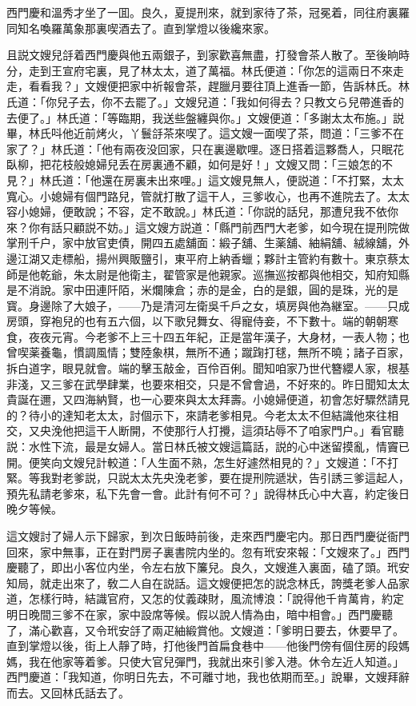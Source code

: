 西門慶和溫秀才坐了一囬。良久，夏提刑來，就到家待了茶，冠冕着，同往府裏羅同知名喚羅萬象那裏喫酒去了。直到掌燈以後纔來家。

且説文嫂兒㧱着西門慶與他五兩銀子，到家歡喜無盡，打發會茶人散了。至後晌時分，走到王宣府宅裏，見了林太太，道了萬福。林氏便道：「你怎的這兩日不來走走，看看我？」文嫂便把家中祈報會茶，趕臘月要往頂上進香一節，告訴林氏。林氏道：「你兒子去，你不去罷了。」文嫂兒道：「我如何得去？只教文ら兒帶進香的去便了。」林氏道：「等臨期，我送些盤纏與你。」文嫂便道：「多謝太太布施。」説畢，林氏呌他近前烤火，丫鬟㧱茶來喫了。這文嫂一面喫了茶，問道：「三爹不在家了？」林氏道：「他有兩夜没回家，只在裏邊歇哩。逐日搭着這夥喬人，只眠花臥柳，把花枝般媳婦兒丢在房裏通不顧，如何是好！」文嫂又問：「三娘怎的不見？」林氏道：「他還在房裏未出來哩。」這文嫂見無人，便説道：「不打緊，太太寬心。小媳婦有個門路兒，管就打散了這干人，三爹收心，也再不進院去了。太太容小媳婦，便敢說；不容，定不敢說。」林氏道：「你説的話兒，那遭兒我不依你來？你有話只顧説不妨。」這文嫂方説道：「縣門前西門大老爹，如今現在提刑院做掌刑千户，家中放官吏債，開四五處舖面：緞子舖、生薬舖、紬絹舖、絨線舖，外邊江湖又走標船，揚州興販鹽引，東平府上納香蠟；夥計主管約有數十。東京蔡太師是他乾爺，朱太尉是他衛主，翟管家是他親家。巡撫巡按都與他相交，知府知縣是不消說。家中田連阡陌，米爛陳倉；赤的是金，白的是銀，圓的是珠，光的是寳。身邊除了大娘子，——乃是清河左衛吳千戶之女，填房與他為継室。——只成房頭，穿袍兒的也有五六個，以下歌兒舞女、得寵侍妾，不下數十。端的朝朝寒食，夜夜元宵。今老爹不上三十四五年紀，正是當年漢子，大身材，一表人物；也曾喫薬養龜，慣調風情；雙陸象棋，無所不通；蹴踘打毬，無所不曉；諸子百家，拆白道字，眼見就會。端的擊玉敲金，百伶百俐。聞知咱家乃世代簪纓人家，根基非淺，又三爹在武學肆業，也要來相交，只是不曾會過，不好來的。昨日聞知太太貴誕在邇，又四海納賢，也一心要來與太太拜壽。小媳婦便道，初會怎好驟然請見的？待小的達知老太太，討個示下，來請老爹相見。今老太太不但結識他來往相交，又央浼他把這干人断開，不使那行人打攪，這須玷辱不了咱家門户。」看官聽説：水性下流，最是女婦人。當日林氏被文嫂這篇話，説的心中迷留摸亂，情竇已開。便笑向文嫂兒計較道：「人生面不熟，怎生好遽然相見的？」文嫂道：「不打緊。等我對老爹説，只説太太先央浼老爹，要在提刑院遞狀，告引誘三爹這起人，預先私請老爹來，私下先會一會。此計有何不可？」說得林氏心中大喜，約定後日晚夕等候。

這文嫂討了婦人示下歸家，到次日飯時前後，走來西門慶宅内。那日西門慶従衙門回來，家中無事，正在對門房子裏書院内坐的。忽有玳安來報：「文嫂來了。」西門慶聽了，即出小客位内坐，令左右放下簾兒。良久，文嫂進入裏面，磕了頭。玳安知局，就走出來了，敎二人自在説話。這文嫂便把怎的説念林氏，誇獎老爹人品家道，怎樣行時，結識官府，又怎的仗義疎財，風流博浪：「說得他千肯萬肯，約定明日晚間三爹不在家，家中設席等候。假以說人情為由，暗中相會。」西門慶聽了，滿心歡喜，又令玳安㧱了兩疋紬緞賞他。文嫂道：「爹明日要去，休要早了。直到掌燈以後，街上人靜了時，打他後門首扁食巷中——他後門傍有個住房的段媽媽，我在他家等着爹。只使大官兒彈門，我就出來引爹入港。休令左近人知道。」西門慶道：「我知道，你明日先去，不可離寸地，我也依期而至。」說畢，文嫂拜辭而去。又回林氏話去了。

